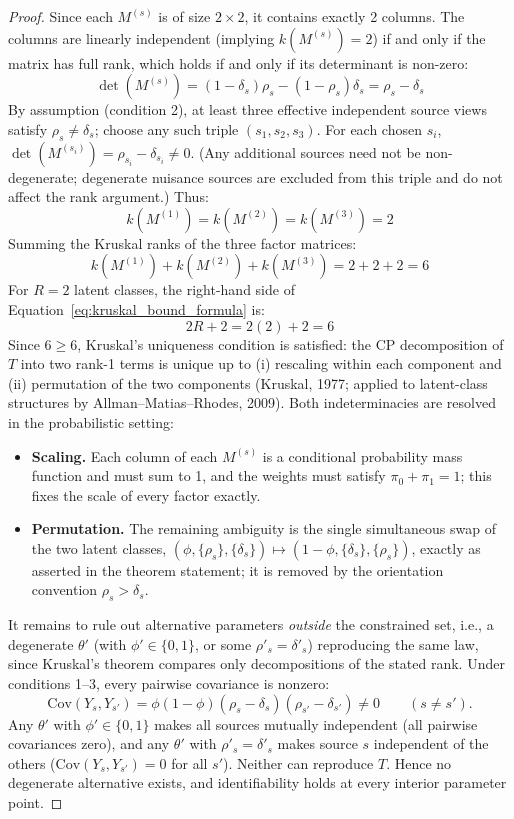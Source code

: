 \documentclass[11pt,a4paper]{article}
\begin{document}
\begin{proof}
Since each $M^{(s)}$ is of size $2 \times 2$, it contains exactly 2 columns. The columns are linearly independent (implying $k(M^{(s)}) = 2$) if and only if the matrix has full rank, which holds if and only if its determinant is non-zero:
\[
\det(M^{(s)}) = (1-\delta_s)\rho_s - (1-\rho_s)\delta_s = \rho_s - \delta_s
\]
By assumption (condition 2), at least three effective independent source views satisfy $\rho_s \neq \delta_s$; choose any such triple $(s_1, s_2, s_3)$. For each chosen $s_i$, $\det(M^{(s_i)}) = \rho_{s_i} - \delta_{s_i} \neq 0$. (Any additional sources need not be non-degenerate; degenerate nuisance sources are excluded from this triple and do not affect the rank argument.) Thus: %
\[
k(M^{(1)}) = k(M^{(2)}) = k(M^{(3)}) = 2
\]
Summing the Kruskal ranks of the three factor matrices:
\[
k(M^{(1)}) + k(M^{(2)}) + k(M^{(3)}) = 2 + 2 + 2 = 6
\]
For $R=2$ latent classes, the right-hand side of Equation~\eqref{eq:kruskal_bound_formula} is:
\[
2R + 2 = 2(2) + 2 = 6
\]
Since $6 \ge 6$, Kruskal's uniqueness condition is satisfied: the CP decomposition of $T$ into two rank-1 terms is unique up to (i) rescaling within each component and (ii) permutation of the two components (Kruskal, 1977; applied to latent-class structures by Allman--Matias--Rhodes, 2009). Both indeterminacies are resolved in the probabilistic setting: %
\begin{itemize}
    \item \textbf{Scaling.} Each column of each $M^{(s)}$ is a conditional probability mass function and must sum to 1, and the weights must satisfy $\pi_0 + \pi_1 = 1$; this fixes the scale of every factor exactly. %
    \item \textbf{Permutation.} The remaining ambiguity is the single simultaneous swap of the two latent classes, $(\phi, \{\rho_s\}, \{\delta_s\}) \mapsto (1-\phi, \{\delta_s\}, \{\rho_s\})$, exactly as asserted in the theorem statement; it is removed by the orientation convention $\rho_s > \delta_s$. %
\end{itemize}

It remains to rule out alternative parameters \emph{outside} the constrained set, i.e., a degenerate $\theta'$ (with $\phi' \in \{0, 1\}$, or some $\rho'_s = \delta'_s$) reproducing the same law, since Kruskal's theorem compares only decompositions of the stated rank. Under conditions 1--3, every pairwise covariance is nonzero: %
\[
\mathrm{Cov}(Y_s, Y_{s'}) = \phi(1 - \phi)(\rho_s - \delta_s)(\rho_{s'} - \delta_{s'}) \neq 0 \qquad (s \neq s'). %
\]
Any $\theta'$ with $\phi' \in \{0, 1\}$ makes all sources mutually independent (all pairwise covariances zero), and any $\theta'$ with $\rho'_s = \delta'_s$ makes source $s$ independent of the others ($\mathrm{Cov}(Y_s, Y_{s'}) = 0$ for all $s'$). Neither can reproduce $T$. Hence no degenerate alternative exists, and identifiability holds at every interior parameter point. %


\end{proof}
\end{document}
